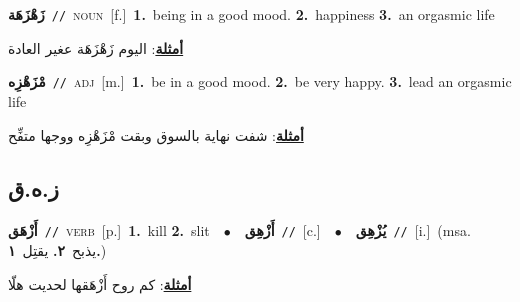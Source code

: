 \documentclass[10pt,a4paper,twoside]{article} %
\begin{document}
\begin{multicols}{2}
{\setlength\topsep{0pt}\textbf{\foreignlanguage{arabic}{زَهْزَهَة}}\ {\color{gray}\texttt{//}\color{black}}\ \textsc{noun}\ [f.]\ \textbf{1.}~being in a good mood.  \textbf{2.}~happiness  \textbf{3.}~an orgasmic life\  \begin{flushright}\color{gray}\foreignlanguage{arabic}{\textbf{\underline{\foreignlanguage{arabic}{أمثلة}}}: اليوم زَهْزَهَة عغير العادة}\end{flushright}\color{black}} \vspace{2mm}

{\setlength\topsep{0pt}\textbf{\foreignlanguage{arabic}{مْزَهْزِه}}\ {\color{gray}\texttt{//}\color{black}}\ \textsc{adj}\ [m.]\ \textbf{1.}~be in a good mood.  \textbf{2.}~be very happy.  \textbf{3.}~lead an orgasmic life\  \begin{flushright}\color{gray}\foreignlanguage{arabic}{\textbf{\underline{\foreignlanguage{arabic}{أمثلة}}}: شفت نهاية بالسوق وبقت مْزَهْزِه ووجها متفِّح}\end{flushright}\color{black}} \vspace{2mm}

\vspace{-3mm}
\subsection*{\color{blue}\foreignlanguage{arabic}{ز.ه.ق}\color{blue}{}} 

{\setlength\topsep{0pt}\textbf{\foreignlanguage{arabic}{أَزْهَق}}\ {\color{gray}\texttt{//}\color{black}}\ \textsc{verb}\ [p.]\ \textbf{1.}~kill  \textbf{2.}~slit\ \ $\bullet$\ \ \setlength\topsep{0pt}\textbf{\foreignlanguage{arabic}{أَزْهِق}}\ {\color{gray}\texttt{//}\color{black}}\ [c.]\ \ $\bullet$\ \ \setlength\topsep{0pt}\textbf{\foreignlanguage{arabic}{يُزْهِق}}\ {\color{gray}\texttt{//}\color{black}}\ [i.]\ \color{gray}(msa. \foreignlanguage{arabic}{يذبح}~\foreignlanguage{arabic}{\textbf{٢.}}  \foreignlanguage{arabic}{يقتِل}~\foreignlanguage{arabic}{\textbf{١.}})\color{black}\  \begin{flushright}\color{gray}\foreignlanguage{arabic}{\textbf{\underline{\foreignlanguage{arabic}{أمثلة}}}: كم روح أَزْهَقها لحديت هلّا}\end{flushright}\color{black}} \vspace{2mm}


\end{multicols}
\end{document}
